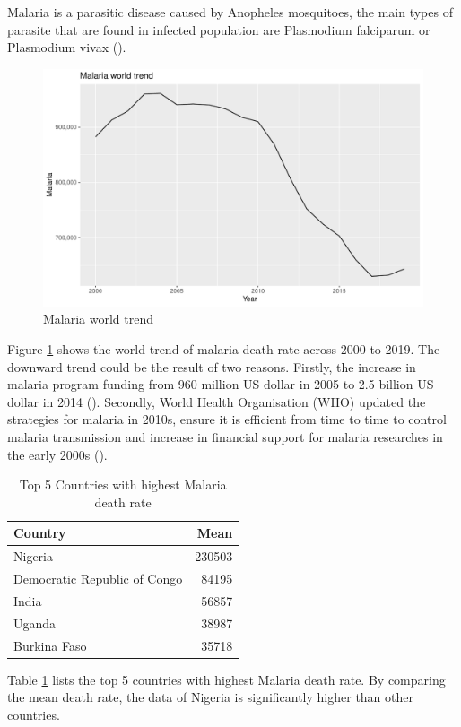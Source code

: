\documentclass[11pt,a4paper,]{article}
\begin{document}
Malaria is a parasitic disease caused by Anopheles mosquitoes, the main types of parasite that are found in infected population are Plasmodium
falciparum or Plasmodium vivax (\textcite{malariaintro}).

\begin{figure}
\includegraphics[width=0.7\linewidth]{report_files/figure-latex/worldtrend-1} \caption{Malaria world trend}\label{fig:worldtrend}
\end{figure}

Figure \ref{fig:worldtrend} shows the world trend of malaria death rate across 2000 to 2019. The downward trend could be the result of two reasons. Firstly, the increase in malaria program funding from 960 million US dollar in 2005 to 2.5 billion US dollar in 2014 (\textcite{MalariaTrend}). Secondly, World Health Organisation (WHO) updated the strategies for malaria in 2010s, ensure it is efficient from time to time to control malaria transmission and increase in financial support for malaria researches in the early 2000s (\textcite{MalariaTrend2}).

\begin{table}

\caption{\label{tab:countries}Top 5 Countries with highest Malaria death rate}
\centering
\begin{tabular}[t]{l|r}
\hline
Country & Mean\\
\hline
Nigeria & 230503\\
\hline
Democratic Republic of Congo & 84195\\
\hline
India & 56857\\
\hline
Uganda & 38987\\
\hline
Burkina Faso & 35718\\
\hline
\end{tabular}
\end{table}

Table \ref{tab:countries} lists the top 5 countries with highest Malaria death rate. By comparing the mean death rate, the data of Nigeria is significantly higher than other countries.
\end{document}
